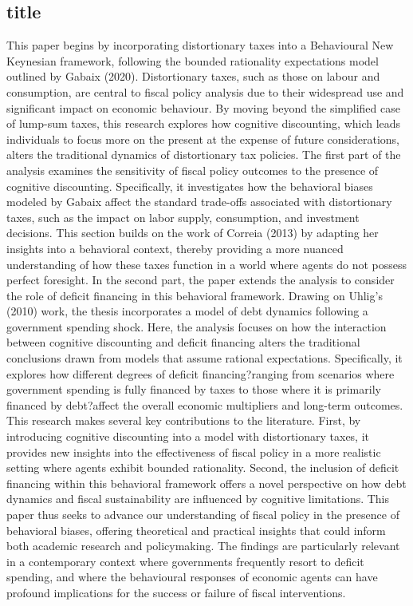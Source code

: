 \documentclass[11pt]{article}
\newcommand{\bb}{\bigbreak\noindent}
\begin{document}
\begin{spacing}{2}
\subsection{title}
This paper begins by incorporating distortionary taxes into a Behavioural New Keynesian framework, following the bounded rationality expectations model outlined by Gabaix (2020). Distortionary taxes, such as those on labour and consumption, are central to fiscal policy analysis due to their widespread use and significant impact on economic behaviour. By moving beyond the simplified case of lump-sum taxes, this research explores how cognitive discounting, which leads individuals to focus more on the present at the expense of future considerations, alters the traditional dynamics of distortionary tax policies.
\bb
The first part of the analysis examines the sensitivity of fiscal policy outcomes to the presence of cognitive discounting. Specifically, it investigates how the behavioral biases modeled by Gabaix affect the standard trade-offs associated with distortionary taxes, such as the impact on labor supply, consumption, and investment decisions. This section builds on the work of Correia (2013) by adapting her insights into a behavioral context, thereby providing a more nuanced understanding of how these taxes function in a world where agents do not possess perfect foresight.
\bb
In the second part, the paper extends the analysis to consider the role of deficit financing in this behavioral framework. Drawing on Uhlig's (2010) work, the thesis incorporates a model of debt dynamics following a government spending shock. Here, the analysis focuses on how the interaction between cognitive discounting and deficit financing alters the traditional conclusions drawn from models that assume rational expectations. Specifically, it explores how different degrees of deficit financing?ranging from scenarios where government spending is fully financed by taxes to those where it is primarily financed by debt?affect the overall economic multipliers and long-term outcomes.
\bb
This research makes several key contributions to the literature. First, by introducing cognitive discounting into a model with distortionary taxes, it provides new insights into the effectiveness of fiscal policy in a more realistic setting where agents exhibit bounded rationality. Second, the inclusion of deficit financing within this behavioral framework offers a novel perspective on how debt dynamics and fiscal sustainability are influenced by cognitive limitations.
\bb
This paper thus seeks to advance our understanding of fiscal policy in the presence of behavioral biases, offering theoretical and practical insights that could inform both academic research and policymaking. The findings are particularly relevant in a contemporary context where governments frequently resort to deficit spending, and where the behavioural responses of economic agents can have profound implications for the success or failure of fiscal interventions.





\end{spacing}
\end{document}
